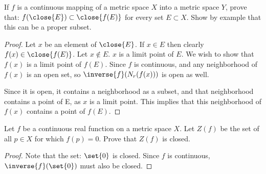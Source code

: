 \documentclass[12pt, letterpaper]{paper}
\begin{document}
\begin{question}
  If $f$ is a continuous mapping of a metric space $X$ into a metric
  space $Y$, prove that: $f(\close{E}) \subset \close{f(E)}$ for every set
  $E \subset X$. Show by example that this can be a proper subset.

  \begin{proof}
    Let $x$ be an element of $\close{E}$. If $x \in E$ then clearly
    $f(x) \in \close{f(E)}$. Let $x \notin E$. $x$ is a limit point of
    $E$. We wish to show that $f(x)$ is a limit point of $f(E)$. Since
    $f$ is continuous, and any neighborhood of $f(x)$ is an open set,
    so $\inverse{f}( N_r(f(x)))$ is open as well.

    Since it is open, it contains a neighborhood as a subset, and that
    neighborhood contains a point of E, as $x$ is a limit point. This
    implies that this neighborhood of $f(x)$ contains a point of
    $f(E)$.

    
  \end{proof}
\end{question}

\begin{question}
  Let $f$ be a continuous real function on a metric space $X$. Let
  $Z(f)$ be the set of all $p \in X$ for which $f(p) = 0$. Prove that
  $Z(f)$ is closed.

  \begin{proof}
    Note that the set: $\set{0}$ is closed. Since $f$ is continuous,
    $\inverse{f}(\set{0})$ must also be closed. 
  \end{proof}
\end{question}
\end{document}
